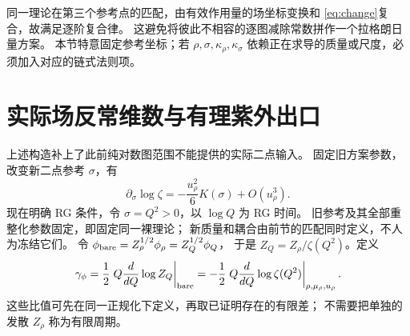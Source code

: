 \documentclass[11pt,a4paper]{ctexart}
\theoremstyle{cnplain}
\theoremstyle{remark}\newtheorem{remark}[theorem]{注}
\begin{document}
同一理论在第三个参考点的匹配，由有效作用量的场坐标变换和
\eqref{eq:change}复合，故满足逐阶复合律。
这避免将彼此不相容的逐图减除常数拼作一个拉格朗日量方案。
本节特意固定参考坐标；若 $\rho,\sigma,\kappa_\rho,\kappa_\sigma$
依赖正在求导的质量或尺度，必须加入对应的链式法则项。

\section{实际场反常维数与有理紫外出口}
上述构造补上了此前纯对数图范围不能提供的实际二点输入。
固定旧方案参数，改变新二点参考 $\sigma$，有
\begin{equation}\label{eq:scale-response}
 \partial_\sigma\log\zeta=-\frac{u_\rho^2}{6}K(\sigma)+O(u_\rho^3).
\end{equation}
现在明确 RG 条件，令 $\sigma=Q^2>0$，以 $\log Q$ 为 RG 时间。
旧参考及其全部重整化参数固定，即固定同一裸理论；
新质量和耦合由前节的匹配同时定义，不人为冻结它们。
令 $\phi_{\rm bare}=Z_\rho^{1/2}\phi_\rho=Z_Q^{1/2}\phi_Q$，
于是 $Z_Q=Z_\rho/\zeta(Q^2)$。定义
\begin{equation}\label{eq:gamma-def}
 \gamma_\phi=\frac12\left.Q\frac{d}{dQ}\log Z_Q\right|_{\rm bare}
 =-\frac12\left.Q\frac{d}{dQ}\log\zeta(Q^2)\right|_{\rho,\mu_\rho,u_\rho}.
\end{equation}
这些比值可先在同一正规化下定义，再取已证明存在的有限差；
不需要把单独的发散 $Z_\rho$ 称为有限周期。
\end{document}
